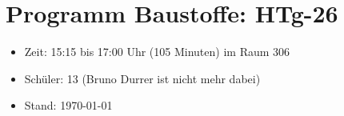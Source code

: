 \documentclass[
11pt,
captions=tableheading,
headings=big,
headsepline,
footsepline, 
captions=tableheading,
parskip=half-,
]{scrartcl}
\title{\fach}
\date{2024}
\newcommand{\klasse}{HTg-26\xspace}
\begin{document}
\section*{Programm Baustoffe: \klasse}
\begin{itemize}[noitemsep]
    \item Zeit: 15:15 bis 17:00 Uhr (105 Minuten) im Raum 306
    \item Schüler: 13 (Bruno Durrer ist nicht mehr dabei)
    \item Stand: \today
\end{itemize}


\vspace{0.25cm}

\setcounter{lecture}{0}
\newcommand{\nr}{\stepcounter{lecture}\thelecture} %
\end{document}
